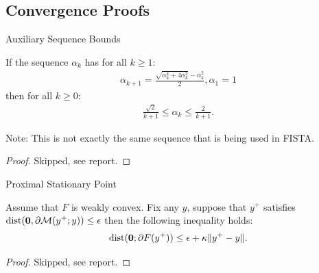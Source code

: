 \documentclass[11pt]{beamer}
\begin{document}
    \subsection{Convergence Proofs}
        \begin{frame}{Auxiliary Sequence Bounds}
            \begin{lemma}
                If the sequence $\alpha_k$ has for all $k\ge 1$: 
                \begin{align*}
                    \alpha_{k + 1} = \frac{\sqrt{\alpha_k^4 + 4\alpha_k^2} - \alpha_k^2}{2}, \alpha_1 = 1
                \end{align*}
                then for all $k \ge0$: 
                \begin{align*}
                    \frac{\sqrt{2}}{k + 1} \le \alpha_k \le \frac{2}{k + 1}. 
                \end{align*}    
            \end{lemma}
            Note: This is not exactly the same sequence that is being used in FISTA. 
            \begin{proof}
                Skipped,  see report. 
            \end{proof}
        \end{frame}
        \begin{frame}{Proximal Stationary Point}
            \begin{lemma}[Lemma B.2]
                Assume that $F$ is weakly convex. 
                Fix any $y$, suppose that $y^+$ satisfies $\operatorname{dist}(\mathbf 0,\partial \mathcal M(y^+; y)) \le \epsilon$ then the following inequality holds: 
                \begin{align*}
                    \operatorname{dist}(\mathbf 0; \partial F(y^+)) 
                    \le \epsilon + \kappa\Vert y^+ - y\Vert. 
                \end{align*}    
            \end{lemma}
            \begin{proof}
                Skipped, see report. 
            \end{proof}
        \end{frame}
\end{document}
